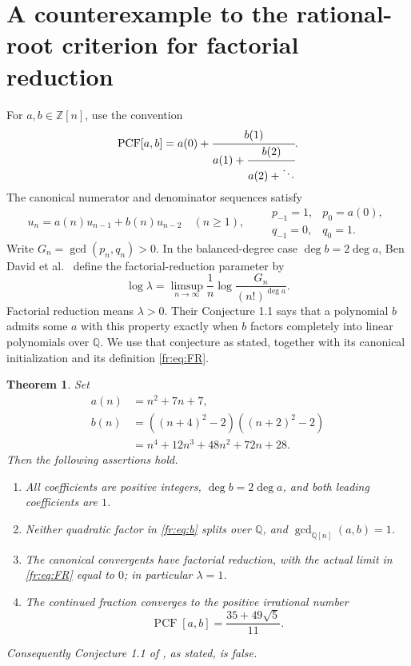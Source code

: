 \documentclass[11pt,a4paper]{article}
\newcommand{\Q}{\mathbb Q}
\newcommand{\Z}{\mathbb Z}
\DeclareMathOperator{\PCF}{PCF}
\newtheorem{theorem}{Theorem}[section]
\theoremstyle{definition}
\theoremstyle{remark}
\numberwithin{equation}{section}
\begin{document}
\section{A counterexample to the rational-root criterion for factorial reduction}

For $a,b\in\Z[n]$, use the convention
\[
 \PCF[a,b]=a(0)+\cfrac{b(1)}{a(1)+
 \cfrac{b(2)}{a(2)+\ddots}}.
\]
The canonical numerator and denominator sequences satisfy
\begin{equation}\label{fr:eq:recurrence}
 u_n=a(n)u_{n-1}+b(n)u_{n-2}\quad(n\ge1),
 \qquad
 \begin{array}{ll}p_{-1}=1,&p_0=a(0),\\
 q_{-1}=0,&q_0=1.\end{array}
\end{equation}
Write $G_n=\gcd(p_n,q_n)>0$. In the balanced-degree case
$\deg b=2\deg a$, Ben David et al.\ \cite{BND} define the
factorial-reduction parameter by
\begin{equation}\label{fr:eq:FR}
 \log\lambda=
 \limsup_{n\to\infty}\frac1n
 \log\frac{G_n}{(n!)^{\deg a}}.
\end{equation}
Factorial reduction means $\lambda>0$.
Their Conjecture 1.1 says that a polynomial $b$ admits some $a$
with this property exactly when $b$ factors completely into linear
polynomials over $\Q$. We use that conjecture as stated, together
with its canonical initialization and its definition \eqref{fr:eq:FR}.

\begin{theorem}\label{fr:thm:main}
Set
\begin{align}
 a(n)&=n^2+7n+7,\label{fr:eq:a}\\
 b(n)&=((n+4)^2-2)((n+2)^2-2)\label{fr:eq:b}\\
 &=n^4+12n^3+48n^2+72n+28.\nonumber
\end{align}
Then the following assertions hold.
\begin{enumerate}
 \item All coefficients are positive integers,
 $\deg b=2\deg a$, and both leading coefficients are $1$.
 \item Neither quadratic factor in \eqref{fr:eq:b} splits over $\Q$,
 and $\gcd_{\Q[n]}(a,b)=1$.
 \item The canonical convergents have factorial reduction, with the
 actual limit in \eqref{fr:eq:FR} equal to $0$; in particular $\lambda=1$.
 \item The continued fraction converges to the positive irrational
 number
 \[
   \PCF[a,b]=\frac{35+49\sqrt5}{11}.
 \]
\end{enumerate}
Consequently Conjecture 1.1 of \cite{BND}, as stated, is false.
\end{theorem}
\end{document}
